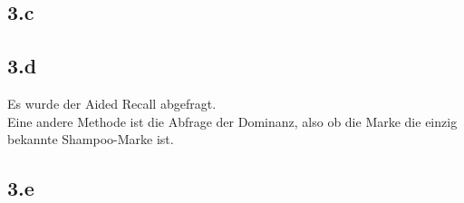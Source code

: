 \subsection{3.c}

\subsection{3.d}
    Es wurde der Aided Recall abgefragt. \\
    Eine andere Methode ist die Abfrage der Dominanz, also ob die Marke die einzig bekannte Shampoo-Marke ist.

\subsection{3.e}



\section{}